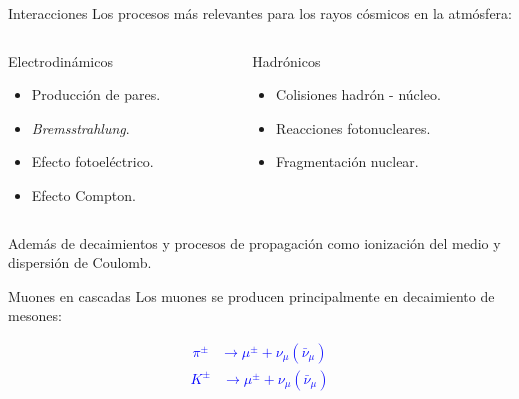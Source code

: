 \documentclass[10pt,xcolor=table]{beamer}
\begin{document}
\begin{frame}{Interacciones}
\vspace{\fill}
Los procesos m\'as relevantes para los rayos c\'osmicos en la atm\'osfera: \vspace{0.5 cm}
	\begin{columns}
		\begin{column}{0.5\textwidth}
			\begin{block}{Electrodin\'amicos}
				\begin{itemize}
				\item Producci\'on de pares.
				\item \textit{Bremsstrahlung}.
				\item Efecto fotoel\'ectrico.
				\item Efecto Compton.
				\end{itemize}
			\end{block}
		\end{column}
		\begin{column}{0.5\textwidth}
			\begin{block}{Hadr\'onicos}
			\vspace{0.225 cm}
				\begin{itemize}
				\item Colisiones hadr\'on - n\'ucleo.
				\item Reacciones fotonucleares.
				\item Fragmentaci\'on nuclear.
				\end{itemize}
			\vspace{0.255 cm}
			\end{block}
		\end{column}
	\end{columns}
	\vspace{0.5 cm}
	Adem\'as de decaimientos y procesos de propagaci\'on como ionizaci\'on del medio y dispersi\'on de Coulomb.
	\vspace{\fill}
\end{frame}

\begin{frame}{Muones en cascadas}
Los muones se producen principalmente en decaimiento de mesones: \vspace{0.5 cm}
	\begin{LARGE}
	\textcolor{blue} {
		\begin{align*}
		\pi^{\pm}	&\longrightarrow 	\mu^{\pm} + \nu_{\mu}(\bar{\nu}_{\mu})
		\end{align*}
		\begin{align*}
		K^{\pm}		&\longrightarrow 	\mu^{\pm} + \nu_{\mu}(\bar{\nu}_{\mu})
		\end{align*}
	}
	\end{LARGE}

\end{frame}
\end{document}
